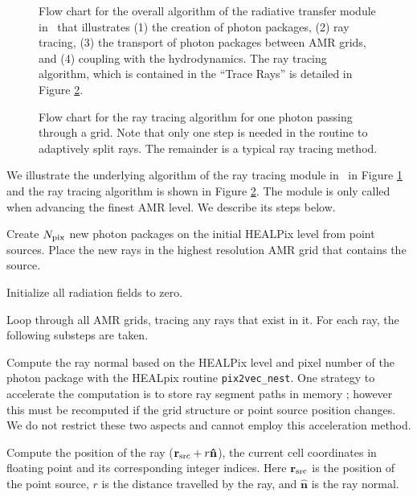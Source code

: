 \documentclass[12pt,preprint]{aastex}
\begin{document}
\begin{figure}[t]
  \caption{\label{fig:MainAlgorithm} Flow chart for the overall
    algorithm of the radiative transfer module in \enzo~that
    illustrates (1) the creation of photon packages, (2) ray tracing,
    (3) the transport of photon packages between AMR grids, and (4)
    coupling with the hydrodynamics.  The ray tracing algorithm, which
    is contained in the ``Trace Rays'' is detailed in Figure
    \ref{fig:RTalgorithm}.}
\end{figure}

\begin{figure}[t]
  \caption{\label{fig:RTalgorithm} Flow chart for the ray tracing
    algorithm for one photon passing through a grid.  Note that only
    one step is needed in the routine to adaptively split rays.  The
    remainder is a typical ray tracing method.}
\end{figure}

We illustrate the underlying algorithm of the ray tracing module in
\enzo~in Figure \ref{fig:MainAlgorithm} and the ray tracing algorithm
is shown in Figure \ref{fig:RTalgorithm}.  The module is only called
when advancing the finest AMR level.  We describe its steps below.

 Create $N_{\rm pix}$ new photon packages on the initial
HEALPix level from point sources.  Place the new rays in the highest
resolution AMR grid that contains the source.

 Initialize all radiation fields to zero.

 Loop through all AMR grids, tracing any rays that exist in
it.  For each ray, the following substeps are taken.

 Compute the ray normal based on the HEALPix level and pixel
number of the photon package with the HEALpix routine
\texttt{pix2vec\_nest}.  One strategy to accelerate the computation is
to store ray segment paths in memory \citep{Abel02_RT,
  Krumholz07_ART}; however this must be recomputed if the grid
structure or point source position changes.  We do not restrict these
two aspects and cannot employ this acceleration method.

 Compute the position of the ray ($\mathbf{r}_{\rm src} + r
\mathbf{\hat{n}}$), the current cell coordinates in floating point and
its corresponding integer indices.  Here $\mathbf{r}_{\rm src}$ is the
position of the point source, $r$ is the distance travelled by the
ray, and $\mathbf{\hat{n}}$ is the ray normal.
\end{document}
